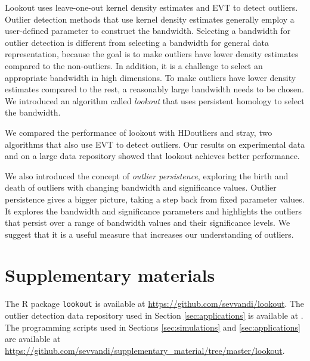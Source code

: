\documentclass[11pt,a4paper,]{article}
\theoremstyle{definition}
\theoremstyle{definition}
\theoremstyle{definition}
\theoremstyle{remark}
\begin{document}
Lookout uses leave-one-out kernel density estimates and EVT to detect outliers. Outlier detection methods that use kernel density estimates generally employ a user-defined parameter to construct the bandwidth. Selecting a bandwidth for outlier detection is different from selecting a bandwidth for general data representation, because the goal is to make outliers have lower density estimates compared to the non-outliers. In addition, it is a challenge to select an appropriate bandwidth in high dimensions. To make outliers have lower density estimates compared to the rest, a reasonably large bandwidth needs to be chosen. We introduced an algorithm called \emph{lookout} that uses persistent homology to select the bandwidth.

We compared the performance of lookout with HDoutliers and stray, two algorithms that also use EVT to detect outliers. Our results on experimental data and on a large data repository showed that lookout achieves better performance.

We also introduced the concept of \emph{outlier persistence}, exploring the birth and death of outliers with changing bandwidth and significance values. Outlier persistence gives a bigger picture, taking a step back from fixed parameter values. It explores the bandwidth and significance parameters and highlights the outliers that persist over a range of bandwidth values and their significance levels. We suggest that it is a useful measure that increases our understanding of outliers.

\hypertarget{sec:suppmat}{%
\section{Supplementary materials}\label{sec:suppmat}}

The R package \texttt{lookout} is available at \url{https://github.com/sevvandi/lookout}.
The outlier detection data repository used in Section \ref{sec:applications} is available at \textcite{datasets}.
The programming scripts used in Sections \ref{sec:simulations} and \ref{sec:applications} are available at \url{https://github.com/sevvandi/supplementary_material/tree/master/lookout}.

\printbibliography
\end{document}
